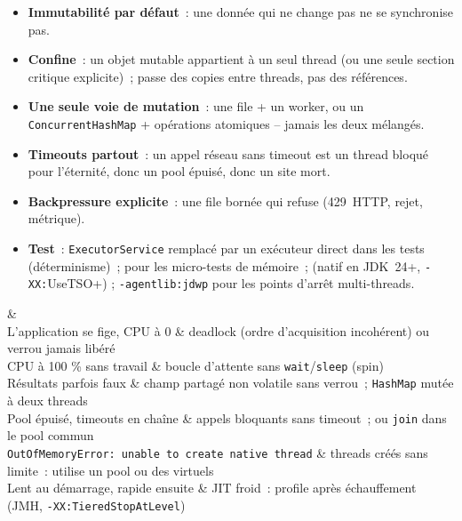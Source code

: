 \begin{itemize}
  \item \textbf{Immutabilit\'e par d\'efaut}~: une donn\'ee qui ne change pas ne se synchronise pas.
  \item \textbf{Confine}~: un objet mutable appartient \`a un seul thread (ou une seule
        section critique explicite)~; passe des copies entre threads, pas des r\'ef\'erences.
  \item \textbf{Une seule voie de mutation}~: une file + un worker, ou un
        \verb|ConcurrentHashMap| + op\'erations atomiques -- jamais les deux m\'elang\'es.
  \item \textbf{Timeouts partout}~: un appel r\'eseau sans timeout est un thread bloqu\'e pour
        l'\'eternit\'e, donc un pool \'epuis\'e, donc un site mort.
  \item \textbf{Backpressure explicite}~: une file born\'ee qui refuse (429~HTTP, rejet, m\'etrique).
  \item \textbf{Test}~: \verb|ExecutorService| remplac\'e par un ex\'ecuteur direct dans les tests
        (d\'eterminisme)~;  pour les
        micro-tests de m\'emoire~;  (natif
        en JDK~24+, \verb+-XX:+UseTSO+) ; \verb|-agentlib:jdwp| pour les points d'arr\^et multi-threads.
\end{itemize}

\begin{tablez}[p{0.34\textwidth}X]
  \headrow {} \&  \\
  \midrule
  L'application se fige, CPU \`a 0 \& deadlock (ordre d'acquisition incoh\'erent) ou verrou jamais lib\'er\'e \\
  CPU \`a 100 \% sans travail \& boucle d'attente sans \verb|wait|/\verb|sleep| (spin) \\
  R\'esultats parfois faux \& champ partag\'e non volatile sans verrou~; \verb|HashMap| mut\'ee \`a deux threads \\
  Pool \'epuis\'e, timeouts en cha\^ine \& appels bloquants sans timeout~; ou \verb|join| dans le pool commun \\
  \verb|OutOfMemoryError: unable to create native thread| \& threads cr\'e\'es sans limite~: utilise un pool ou des virtuels \\
  Lent au d\'emarrage, rapide ensuite \& JIT froid~: profile apr\`es \'echauffement (JMH, \verb|-XX:TieredStopAtLevel|) \\
\end{tablez}

